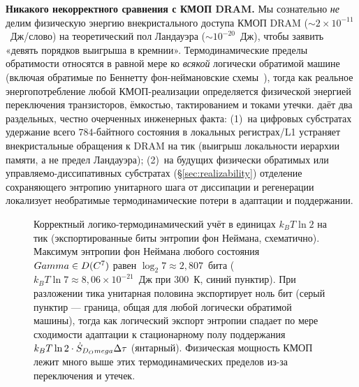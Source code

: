 \noindent\textbf{Никакого некорректного сравнения с КМОП DRAM.} Мы сознательно
\emph{не} делим физическую энергию внекристального доступа КМОП DRAM
($\sim\!2\times10^{-11}$~Дж/слово) на теоретический пол Ландауэра
($\sim\!10^{-20}$~Дж), чтобы заявить «девять порядков выигрыша в кремнии».
Термодинамические пределы обратимости относятся в равной мере ко \emph{всякой}
логически обратимой машине (включая обратимые по Беннетту фон-неймановские
схемы~\cite{bennett1973}), тогда как реальное энергопотребление любой
КМОП-реализации определяется физической энергией переключения транзисторов,
ёмкостью, тактированием и токами утечки. \TALOS{} даёт два раздельных, честно
очерченных инженерных факта: (1)~на цифровых субстратах удержание всего
$784$-байтного состояния в локальных регистрах/L1 устраняет внекристальные
обращения к DRAM на тик (выигрыш локальности иерархии памяти, а не предел
Ландауэра); (2)~на будущих физически обратимых или управляемо-диссипативных
субстратах (\S\ref{sec:realizability}) отделение сохраняющего энтропию
унитарного шага от диссипации и регенерации локализует необратимые
термодинамические потери в адаптации и поддержании.

\begin{figure}[H]
\centering
{}
\caption{Корректный логико-термодинамический учёт в единицах $k_BT\ln 2$ на тик
(экспортированные биты энтропии фон Неймана, схематично). Максимум энтропии фон
Неймана любого состояния $Gamma\in D(C^7)$ равен $\log_2 7\approx
2{,}807$~бита ($k_BT\ln 7\approx 8{,}06\times10^{-21}$~Дж при $300$~К, синий
пунктир). При разложении тика унитарная половина экспортирует ноль бит (серый
пунктир --- граница, общая для любой логически обратимой машины), тогда как
логический экспорт энтропии спадает по мере сходимости адаптации к стационарному
полу поддержания $k_BT\ln 2\cdot\dot S_{D_Omega}\Delta\tau$ (янтарный). Физическая
мощность КМОП лежит много выше этих термодинамических пределов из-за
переключения и утечек.}
\label{fig:energy}
\end{figure}

